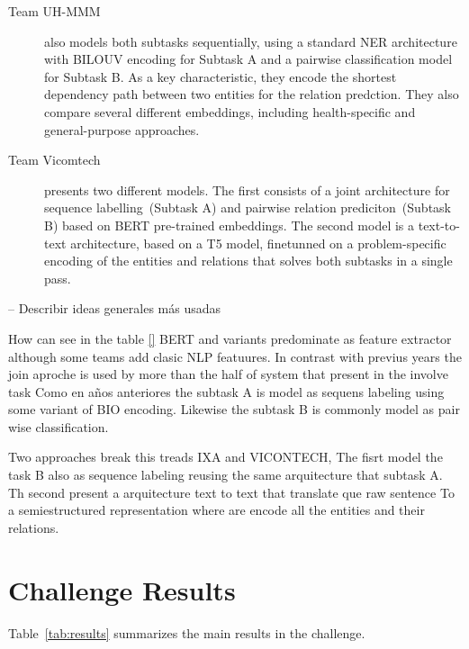\documentclass[a4paper,11pt,twocolumn,twoside]{article}
\begin{document}
\begin{description}
  \item[Team UH-MMM~\cite{uhmmm}] also models both subtasks sequentially, using a standard NER architecture with BILOUV encoding for Subtask A and a pairwise classification model for Subtask B. As a key characteristic, they encode the shortest dependency path between two entities for the relation predction. They also compare several different embeddings, including health-specific and general-purpose approaches.

  \item[Team Vicomtech~\cite{vicomtech}] presents two different models. The first consists of a joint architecture for sequence labelling~(Subtask A) and pairwise relation prediciton~(Subtask B) based on BERT pre-trained embeddings. The second model is a text-to-text architecture, based on a T5 model, finetunned on a problem-specific encoding of the entities and relations that solves both subtasks in a single pass.
\end{description}

-- Describir ideas generales más usadas

How can see in the table \ref{} BERT and variants predominate as feature extractor although
some teams add clasic NLP featuures.
In contrast with previus years the join aproche is used by more than the half of system that present in the involve task
Como en años anteriores the subtask A is model as sequens labeling using some variant of BIO encoding.
Likewise the subtask B is commonly model as pair wise classification.

Two approaches break this treads IXA and VICONTECH, The fisrt model the task B
also as sequence labeling reusing the same arquitecture that subtask A.
Th second present a arquitecture text to text that translate que raw sentence To
a semiestructured representation where are encode all the entities and their relations.

\section{Challenge Results}\label{sec:results}

Table~\ref{tab:results} summarizes the main results in the challenge.
\end{document}
